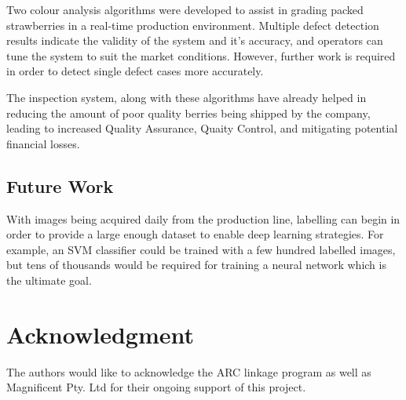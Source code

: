 \documentclass{bmvc2k}
\begin{document}
Two colour analysis algorithms were developed to assist in grading packed strawberries in a real-time production environment. Multiple defect detection results indicate the validity of the system and it's accuracy, and operators can tune the system to suit the market conditions. However, further work is required in order to detect single defect cases more accurately. 

The inspection system, along with these algorithms have already helped in reducing the amount of poor quality berries being shipped by the company, leading to increased Quality Assurance, Quaity Control, and mitigating potential financial losses.


\subsection{Future Work}


With images being acquired daily from the production line, labelling can begin in order to provide a large enough dataset to enable deep learning strategies. For example, an SVM classifier could be trained with a few hundred labelled images, but tens of thousands would be required for training a neural network which is the ultimate goal. 










\section*{Acknowledgment}

The authors would like to acknowledge the ARC linkage program as well as Magnificent Pty. Ltd for their ongoing support of this project. 





\end{document}
